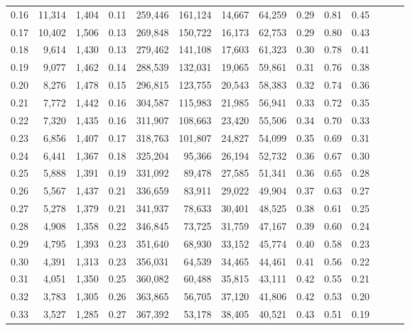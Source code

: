 \begin{tabular}{rrrrrrrrrrrrrr}
0.16 &  11,314 &  1,404 &  0.11 &  259,446 &  161,124 &  14,667 &  64,259 &  0.29 &  0.81 &      0.45 \\
0.17 &  10,402 &  1,506 &  0.13 &  269,848 &  150,722 &  16,173 &  62,753 &  0.29 &  0.80 &      0.43 \\
0.18 &   9,614 &  1,430 &  0.13 &  279,462 &  141,108 &  17,603 &  61,323 &  0.30 &  0.78 &      0.41 \\
0.19 &   9,077 &  1,462 &  0.14 &  288,539 &  132,031 &  19,065 &  59,861 &  0.31 &  0.76 &      0.38 \\
0.20 &   8,276 &  1,478 &  0.15 &  296,815 &  123,755 &  20,543 &  58,383 &  0.32 &  0.74 &      0.36 \\
0.21 &   7,772 &  1,442 &  0.16 &  304,587 &  115,983 &  21,985 &  56,941 &  0.33 &  0.72 &      0.35 \\
0.22 &   7,320 &  1,435 &  0.16 &  311,907 &  108,663 &  23,420 &  55,506 &  0.34 &  0.70 &      0.33 \\
0.23 &   6,856 &  1,407 &  0.17 &  318,763 &  101,807 &  24,827 &  54,099 &  0.35 &  0.69 &      0.31 \\
0.24 &   6,441 &  1,367 &  0.18 &  325,204 &   95,366 &  26,194 &  52,732 &  0.36 &  0.67 &      0.30 \\
0.25 &   5,888 &  1,391 &  0.19 &  331,092 &   89,478 &  27,585 &  51,341 &  0.36 &  0.65 &      0.28 \\
0.26 &   5,567 &  1,437 &  0.21 &  336,659 &   83,911 &  29,022 &  49,904 &  0.37 &  0.63 &      0.27 \\
0.27 &   5,278 &  1,379 &  0.21 &  341,937 &   78,633 &  30,401 &  48,525 &  0.38 &  0.61 &      0.25 \\
0.28 &   4,908 &  1,358 &  0.22 &  346,845 &   73,725 &  31,759 &  47,167 &  0.39 &  0.60 &      0.24 \\
0.29 &   4,795 &  1,393 &  0.23 &  351,640 &   68,930 &  33,152 &  45,774 &  0.40 &  0.58 &      0.23 \\
0.30 &   4,391 &  1,313 &  0.23 &  356,031 &   64,539 &  34,465 &  44,461 &  0.41 &  0.56 &      0.22 \\
0.31 &   4,051 &  1,350 &  0.25 &  360,082 &   60,488 &  35,815 &  43,111 &  0.42 &  0.55 &      0.21 \\
0.32 &   3,783 &  1,305 &  0.26 &  363,865 &   56,705 &  37,120 &  41,806 &  0.42 &  0.53 &      0.20 \\
0.33 &   3,527 &  1,285 &  0.27 &  367,392 &   53,178 &  38,405 &  40,521 &  0.43 &  0.51 &      0.19 \\

\end{tabular}

